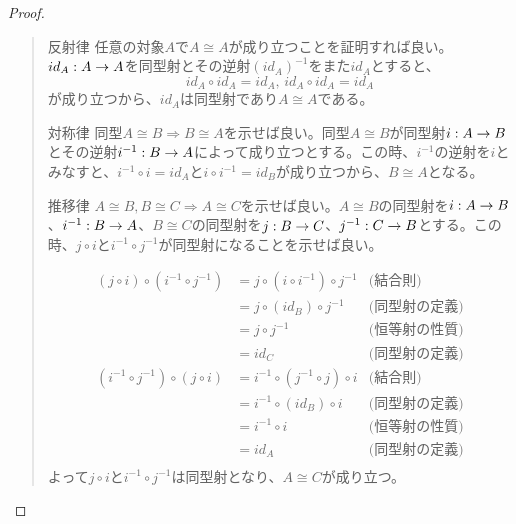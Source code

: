   \begin{proof}~
    \begin{quote}
			\begin{mydescription}
				\item[反射律] 任意の対象$A$で$A\cong A$が成り立つことを証明すれば良い。$id_A:A\rightarrow A$を同型射とその逆射$(id_A)^{-1}$をまた$id_A$とすると、\[id_A\circ id_A = id_A,\,id_A\circ id_A = id_A\]が成り立つから、$id_A$は同型射であり$A\cong A$である。

				\item[対称律] 同型$A\cong B\Longrightarrow B\cong A$を示せば良い。同型$A\cong B$が同型射$i:A\rightarrow B$とその逆射$i^{-1}:B\rightarrow A$によって成り立つとする。この時、$i^{-1}$の逆射を$i$とみなすと、$i^{-1}\circ i=id_A$と$i\circ i^{-1}=id_B$が成り立つから、$B\cong A$となる。
				\item[推移律] $A\cong B,B\cong C\Longrightarrow A\cong C$を示せば良い。$A\cong B$の同型射を$i:A\rightarrow B$、$i^{-1}:B\rightarrow A$、$B\cong C$の同型射を$j:B\rightarrow C$、$j^{-1}:C\rightarrow B$とする。この時、$j\circ i$と$i^{-1}\circ j^{-1}$が同型射になることを示せば良い。
        \begin{center}
        \end{center} 
				\begin{align*}
          (j\circ i)\circ (i^{-1}\circ j^{-1})&=j\circ(i\circ i^{-1})\circ j^{-1}&\text{(結合則)}\\
          &=j\circ(id_B)\circ j^{-1}&\text{(同型射の定義)}\\
          &=j\circ j^{-1}&\text{(恒等射の性質)}\\
          &=id_C&\text{(同型射の定義)}\\
          (i^{-1}\circ j^{-1})\circ(j\circ i)&=i^{-1}\circ(j^{-1}\circ j)\circ i&\text{(結合則)}\\
          &=i^{-1}\circ(id_B)\circ i&\text{(同型射の定義)}\\
          &=i^{-1}\circ i&\text{(恒等射の性質)}\\
          &=id_A&\text{(同型射の定義)}\\
        \end{align*}
        よって$j\circ i$と$i^{-1}\circ j^{-1}$は同型射となり、$A\cong C$が成り立つ。
      \end{mydescription}
    \end{quote}
  \end{proof}

